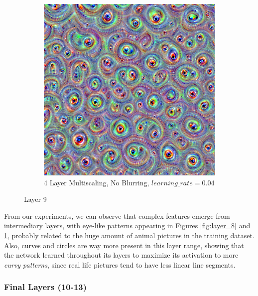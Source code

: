 \begin{figure}
\begin{subfigure}[t]{0.31\textwidth}
    \end{subfigure}
    \hfill
    \begin{subfigure}[t]{0.31\textwidth}
        \captionsetup{justification=centering}
        \centering
        \includegraphics[width=.7\linewidth]{figuras/feat_vis/experiments/intermediary/l9/random_image_pl4_lr4e-2_layer19_no-blur.png}
        \caption{4 Layer Multiscaling, No Blurring, \(learning\_rate = 0.04\)}
    \end{subfigure}
    
    \caption{Layer 9}
    \label{fig:layer_9}
    
\end{figure}

From our experiments, we can observe that complex features emerge from intermediary layers, with eye-like patterns appearing in Figures \ref{fig:layer_8} and \ref{fig:layer_9}, probably related to the huge amount of animal pictures in the training dataset.
Also, curves and circles are way more present in this layer range, showing that the network learned throughout its layers to maximize its activation to more \emph{curvy patterns}, since real life pictures tend to have less linear line segments. 

\subsubsection{Final Layers (10-13)}

